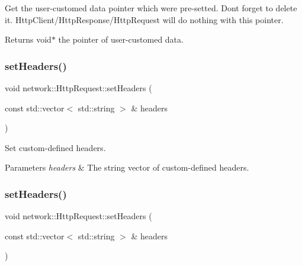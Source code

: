 Get the user-\/customed data pointer which were pre-\/setted. Don\textquotesingle{}t forget to delete it. Http\+Client/\+Http\+Response/\+Http\+Request will do nothing with this pointer.

\begin{DoxyReturn}{Returns}
void$\ast$ the pointer of user-\/customed data. 
\end{DoxyReturn}
\mbox{\label{classnetwork_1_1HttpRequest_aeb33f773e9e3f18864f1945fa3e4e2c4}} 
\subsubsection{\texorpdfstring{set\+Headers()}{setHeaders()}\hspace{0.1cm}{\footnotesize\ttfamily [1/2]}}
{\footnotesize\ttfamily void network\+::\+Http\+Request\+::set\+Headers (\begin{DoxyParamCaption}\item[{const std\+::vector$<$ std\+::string $>$ \&}]{headers }\end{DoxyParamCaption})\hspace{0.3cm}{\ttfamily [inline]}}

Set custom-\/defined headers.


\begin{DoxyParams}{Parameters}
{\em headers} & The string vector of custom-\/defined headers. \\
\hline
\end{DoxyParams}
\mbox{\label{classnetwork_1_1HttpRequest_aeb33f773e9e3f18864f1945fa3e4e2c4}} 
\subsubsection{\texorpdfstring{set\+Headers()}{setHeaders()}\hspace{0.1cm}{\footnotesize\ttfamily [2/2]}}
{\footnotesize\ttfamily void network\+::\+Http\+Request\+::set\+Headers (\begin{DoxyParamCaption}\item[{const std\+::vector$<$ std\+::string $>$ \&}]{headers }\end{DoxyParamCaption})\hspace{0.3cm}{\ttfamily [inline]}}

